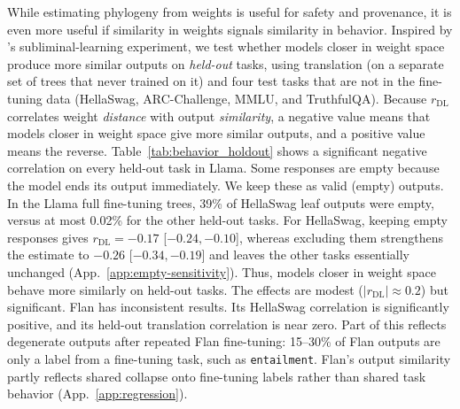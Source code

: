 \documentclass{article}
\theoremstyle{definition}
\theoremstyle{plain}
\begin{document}
While estimating phylogeny from weights is useful for safety and provenance, it is even more useful if similarity in weights signals similarity in behavior. Inspired by \citet{cloud2025subliminal}'s subliminal-learning experiment, we test
whether models closer in weight space produce more similar outputs on \textit{held-out} tasks, using translation
(on a separate set of trees that never trained on it) and four test tasks that are not in the fine-tuning data (HellaSwag, ARC-Challenge, MMLU, and TruthfulQA).
Because $r_{\mathrm{DL}}$ correlates weight \emph{distance} with output \emph{similarity}, a negative value means that models closer in weight space give more similar outputs, and a positive value means the reverse.
Table~\ref{tab:behavior_holdout} shows a significant negative correlation on every held-out task in Llama. Some responses are empty because the model ends its output immediately. We keep these as valid (empty) outputs. In the Llama full fine-tuning trees,
39\% of HellaSwag leaf outputs were empty, versus at most 0.02\% for the other held-out tasks. For HellaSwag, keeping empty responses gives $r_{\mathrm{DL}}=-0.17$ [$-0.24,-0.10$], whereas excluding them strengthens the estimate to $-0.26$ [$-0.34,-0.19$] and leaves the other tasks essentially unchanged (App.~\ref{app:empty-sensitivity}). Thus, models closer in weight space behave more similarly on held-out tasks. The effects are modest ($|r_{\mathrm{DL}}|\approx0.2$) but significant.
Flan has inconsistent results. Its HellaSwag correlation is significantly positive, and its held-out translation correlation is near zero. Part of this reflects degenerate outputs after repeated Flan fine-tuning: 15--30\% of Flan outputs are only a label from a fine-tuning task, such as \texttt{entailment}. Flan's output similarity partly reflects shared collapse onto fine-tuning labels rather than shared task behavior (App.~\ref{app:regression}).
\end{document}
